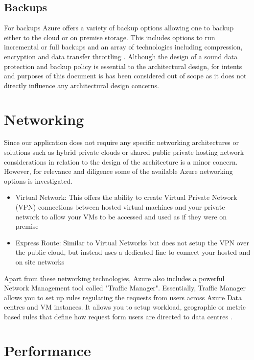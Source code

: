 \subsection{Backups}

For backups Azure offers a variety of backup options allowing one to backup either to the cloud or on premise storage. This includes options to run incremental or full backups and an array of technologies including compression, encryption and data transfer throttling \cite{Microsoft_Corporation_undated-ej}.  Although the design of a sound data protection and backup policy is essential to the architectural design, for intents and purposes of this document is has been considered out of scope as it does not directly influence any architectural design concerns.

\section{Networking}

Since our application does not require any specific networking architectures or solutions such as hybrid private clouds or shared public private hosting network considerations in relation to the design of the architecture is a minor concern. However, for relevance and diligence some of the available Azure networking options is investigated.
 
\begin{itemize}
\item Virtual Network: This offers the ability to create Virtual Private Network (VPN) connections between hosted virtual machines and your private network to allow your VMs to be accessed and used as if they were on premise
\item Express Route: Similar to Virtual Networks but does not setup the VPN over the public cloud, but instead uses a dedicated line to connect your hosted and on site networks
\end{itemize}

Apart from these networking technologies, Azure also includes a powerful Network Management tool called "Traffic Manager". Essentially, Traffic Manager allows you to set up rules regulating the requests from users across Azure Data centres and VM instances. It allows you to setup workload, geographic or metric based rules that define how request form users are directed to data centres \cite{Microsoft_Corporation_undated-ej}.

\section{Performance}

